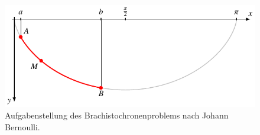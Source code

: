 %
%
%
\begin{figure}
\centering
\includegraphics{chapters/020-variation/images/brachistochronenproblem.pdf}
\caption{Aufgabenstellung des Brachistochronenproblems nach
Johann Bernoulli.
\label{buch:variation:problem:fig:brachistochronenproblem}}
\end{figure}
